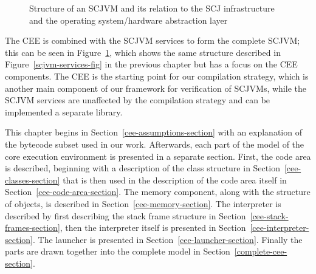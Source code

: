 \begin{figure}[ht]
  \caption{Structure of an SCJVM and its relation to the SCJ
    infrastructure and the operating system/hardware abstraction
    layer}
  \label{cee-fig}
\end{figure}

The CEE is combined with the SCJVM services to form the complete
SCJVM; this can be seen in Figure~\ref{cee-fig}, which shows the same
structure described in Figure~\ref{scjvm-services-fig} in the previous
chapter but has a focus on the CEE components.
The CEE is the starting point for our compilation strategy, which is
another main component of our framework for verification of SCJVMs,
while the SCJVM services are unaffected by the compilation strategy
and can be implemented a separate library.

This chapter begins in Section~\ref{cee-assumptions-section} with an
explanation of the bytecode subset used in our work.
Afterwards, each part of the \Circus{} model of the core execution
environment is presented in a separate section.
First, the code area is described, beginning with a description of the
class structure in Section~\ref{cee-classes-section} that is then used
in the description of the code area itself in
Section~\ref{cee-code-area-section}.
The memory component, along with the structure of objects, is described
in Section~\ref{cee-memory-section}.
The interpreter is described by first describing the stack frame
structure in Section~\ref{cee-stack-frames-section}, then the
interpreter itself is presented in
Section~\ref{cee-interpreter-section}.
The launcher is presented in Section~\ref{cee-launcher-section}.
Finally the parts are drawn together into the complete model in
Section~\ref{complete-cee-section}.

